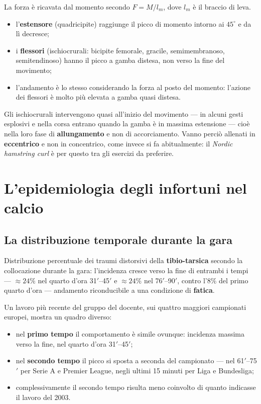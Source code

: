 La forza è ricavata dal momento secondo $F = M / l_m$, dove $l_m$ è il braccio di leva.

\begin{itemize}
  \item l'\textbf{estensore} (quadricipite) raggiunge il picco di momento intorno ai $45^\circ$ e da
    lì decresce;
  \item i \textbf{flessori} (ischiocrurali: bicipite femorale, gracile, semimembranoso,
    semitendinoso) hanno il picco a gamba distesa, non verso la fine del movimento;
  \item l'andamento è lo stesso considerando la forza al posto del momento: l'azione dei flessori è
    molto più elevata a gamba quasi distesa.
\end{itemize}

Gli ischiocrurali intervengono quasi all'inizio del movimento --- in alcuni gesti esplosivi e nella
corsa entrano quando la gamba è in massima estensione --- cioè nella loro fase di
\textbf{allungamento} e non di accorciamento. Vanno perciò allenati in \textbf{eccentrico} e non in
concentrico, come invece si fa abitualmente: il \textit{Nordic hamstring curl} è per questo tra gli
esercizi da preferire.

\section{L'epidemiologia degli infortuni nel calcio}

\subsection{La distribuzione temporale durante la gara}

Distribuzione percentuale dei traumi distorsivi della \textbf{tibio-tarsica} secondo la collocazione
durante la gara: l'incidenza cresce verso la fine di entrambi i tempi --- $\approx 24\%$ nel quarto
d'ora 31$'$--45$'$ e $\approx 24\%$ nel 76$'$--90$'$, contro l'$8\%$ del primo quarto d'ora ---
andamento riconducibile a una condizione di \textbf{fatica}.

Un lavoro più recente del gruppo del docente, sui quattro maggiori campionati europei, mostra un
quadro diverso:
\begin{itemize}
  \item nel \textbf{primo tempo} il comportamento è simile ovunque: incidenza massima verso la fine,
    nel quarto d'ora 31$'$--45$'$;
  \item nel \textbf{secondo tempo} il picco si sposta a seconda del campionato --- nel 61$'$--75$'$
    per Serie A e Premier League, negli ultimi 15 minuti per Liga e Bundesliga;
  \item complessivamente il secondo tempo risulta meno coinvolto di quanto indicasse il lavoro del
    2003.
\end{itemize}

